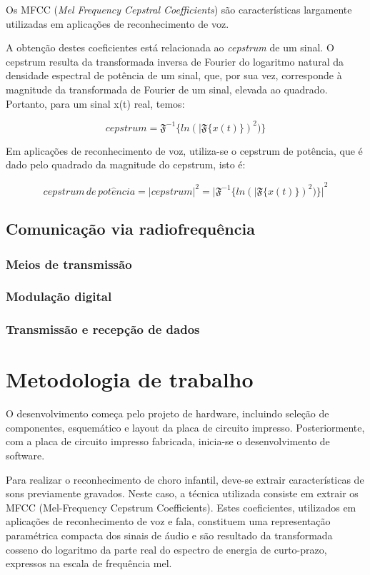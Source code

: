 \documentclass[a4paper, 12pt]{article}
\begin{document}
		Os MFCC (\textit{Mel Frequency Cepstral Coefficients}) são características largamente utilizadas em aplicações de reconhecimento de voz.\cite{benesty2007springer}
		
		A obtenção destes coeficientes está relacionada ao \textit{cepstrum} de um sinal. 
		O cepstrum resulta da transformada inversa de Fourier do logaritmo natural da densidade espectral de potência de um sinal, que, por sua vez, corresponde à magnitude da transformada de Fourier de um sinal, elevada ao quadrado. Portanto, para um sinal x(t) real, temos:
		
		$$ cepstrum = \mathfrak{F}^{-1}\Big\{ln(|\mathfrak{F}\{x(t)\})^{2})\Big\} $$
		
		Em aplicações de reconhecimento de voz, utiliza-se o cepstrum de potência, que é dado pelo quadrado da magnitude do cepstrum, isto é:
		
		$$ cepstrum \, de \, pot\hat{e}ncia = |cepstrum|^{2} = {\Big|\mathfrak{F}^{-1}\Big\{ln(|\mathfrak{F}\{x(t)\})^{2})\Big\}\Big|}^{2} $$
		
		\subsection{Comunicação via radiofrequência}
		\subsubsection{Meios de transmissão}
		\subsubsection{Modulação digital}
		\subsubsection{Transmissão e recepção de dados}
		
		
		
		
		
		
		
		\newpage
	\section{Metodologia de trabalho}
		O desenvolvimento começa pelo projeto de hardware, incluindo seleção de componentes, esquemático e layout da placa de circuito impresso. Posteriormente, com a placa de circuito impresso fabricada, inicia-se o desenvolvimento de software.
		
		Para realizar o reconhecimento de choro infantil, deve-se extrair características de sons previamente gravados. Neste caso, a técnica utilizada consiste em extrair os MFCC (Mel-Frequency Cepstrum Coefficients).
		Estes coeficientes, utilizados em aplicações de reconhecimento de voz e fala, constituem uma representação paramétrica compacta dos sinais de áudio e são resultado da transformada cosseno do logaritmo da parte real do espectro de energia de curto-prazo, expressos na escala de frequência mel. \cite{mfcc_implementation}
		
\end{document}
